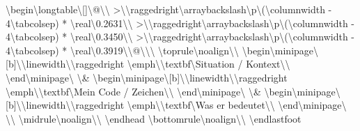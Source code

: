 \textbackslash{}begin\textbackslash{}{longtable\textbackslash{}}[]\textbackslash{}{@\textbackslash{}{\textbackslash{}}
  >\textbackslash{}{\textbackslash{}raggedright\textbackslash{}arraybackslash\textbackslash{}}p\textbackslash{}{(\textbackslash{}columnwidth - 4\textbackslash{}tabcolsep) * \textbackslash{}real\textbackslash{}{0.2631\textbackslash{}}\textbackslash{}}
  >\textbackslash{}{\textbackslash{}raggedright\textbackslash{}arraybackslash\textbackslash{}}p\textbackslash{}{(\textbackslash{}columnwidth - 4\textbackslash{}tabcolsep) * \textbackslash{}real\textbackslash{}{0.3450\textbackslash{}}\textbackslash{}}
  >\textbackslash{}{\textbackslash{}raggedright\textbackslash{}arraybackslash\textbackslash{}}p\textbackslash{}{(\textbackslash{}columnwidth - 4\textbackslash{}tabcolsep) * \textbackslash{}real\textbackslash{}{0.3919\textbackslash{}}\textbackslash{}}@\textbackslash{}{\textbackslash{}}\textbackslash{}}
\textbackslash{}toprule\textbackslash{}noalign\textbackslash{}{\textbackslash{}}
\textbackslash{}begin\textbackslash{}{minipage\textbackslash{}}[b]\textbackslash{}{\textbackslash{}linewidth\textbackslash{}}\textbackslash{}raggedright
\textbackslash{}emph\textbackslash{}{\textbackslash{}textbf\textbackslash{}{Situation / Kontext\textbackslash{}}\textbackslash{}}
\textbackslash{}end\textbackslash{}{minipage\textbackslash{}} \textbackslash{}& \textbackslash{}begin\textbackslash{}{minipage\textbackslash{}}[b]\textbackslash{}{\textbackslash{}linewidth\textbackslash{}}\textbackslash{}raggedright
\textbackslash{}emph\textbackslash{}{\textbackslash{}textbf\textbackslash{}{Mein Code / Zeichen\textbackslash{}}\textbackslash{}}
\textbackslash{}end\textbackslash{}{minipage\textbackslash{}} \textbackslash{}& \textbackslash{}begin\textbackslash{}{minipage\textbackslash{}}[b]\textbackslash{}{\textbackslash{}linewidth\textbackslash{}}\textbackslash{}raggedright
\textbackslash{}emph\textbackslash{}{\textbackslash{}textbf\textbackslash{}{Was er bedeutet\textbackslash{}}\textbackslash{}}
\textbackslash{}end\textbackslash{}{minipage\textbackslash{}} \textbackslash{}\textbackslash{}
\textbackslash{}midrule\textbackslash{}noalign\textbackslash{}{\textbackslash{}}
\textbackslash{}endhead
\textbackslash{}bottomrule\textbackslash{}noalign\textbackslash{}{\textbackslash{}}
\textbackslash{}endlastfoot
